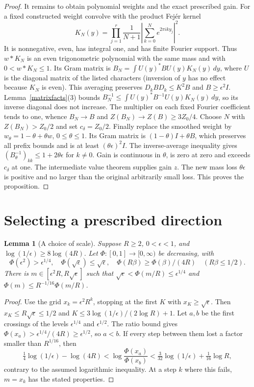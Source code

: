 \documentclass[reqno,a4paper,12pt]{amsart}
\newtheorem{lemma}[theorem]{Lemma}
\begin{document}
\begin{proof}
It remains to obtain polynomial weights and the exact prescribed gain.
For a fixed constructed weight convolve with the product Fej\'er kernel
\[
 K_N(y)=\prod_{j=1}^r\frac1{N+1}
 \left|\sum_{k=0}^N e^{2\pi iky_j}\right|^2.
\]
It is nonnegative, even, has integral one, and has finite Fourier support.
Thus $w*K_N$ is an even trigonometric polynomial with the same mass
and with $0<w*K_N\le1$. Its Gram matrix is
$B_N=\int U(y)^*BU(y)K_N(y)\,dy$, where $U$ is the diagonal matrix of
the listed characters (inversion of $y$ has no effect because $K_N$ is even).
This averaging preserves $D_kBD_k\le K^2B$ and $B\ge\epsilon^2I$.
Lemma~\ref{matrixfacts}(3) bounds
$B_N^{-1}\le\int U(y)^*B^{-1}U(y)K_N(y)\,dy$,
so its inverse diagonal does not increase.
The multiplier on each fixed Fourier coefficient tends to one, whence
$B_N\to B$ and $Z(B_N)\to Z(B)\ge3Z_0/4$.
Choose $N$ with $Z(B_N)>Z_0/2$ and set $c_\delta=Z_0/2$.
Finally replace the smoothed weight by $w_\theta=1-\theta+\theta w$,
$0\le\theta\le1$. Its Gram matrix is $(1-\theta)I+\theta B$,
which preserves all prefix bounds and is at least $(\theta\epsilon)^2I$.
The inverse-average inequality gives
$(B_\theta^{-1})_{kk}\le1+2\theta\epsilon$ for $k\ne0$.
Gain is continuous in $\theta$, is zero at zero and exceeds $c_\delta$
at one. The intermediate value theorem supplies gain $z$.
The new mass loss $\theta\epsilon$ is positive and no larger than the
original arbitrarily small loss. This proves the proposition.
\end{proof}

\section{Selecting a prescribed direction}

\begin{lemma}[A choice of scale]\label{scale}
Suppose $R\ge2$, $0<\epsilon<1$, and
$\log(1/\epsilon)\ge8\log(4R)$.
Let $\Phi:[0,1]\to[0,\infty)$ be decreasing, with
\[
 \Phi(\epsilon^2)>\epsilon^{1/4},\quad
 \Phi(\sqrt\epsilon)\le\sqrt\epsilon,\quad
 \Phi(R\beta)\ge\Phi(\beta)/(4R)\quad(R\beta\le1/2).
\]
There is $m\in[\epsilon^2R,R\sqrt\epsilon]$ such that
$\sqrt\epsilon<\Phi(m/R)\le\epsilon^{1/4}$ and
$\Phi(m)\le R^{-1/16}\Phi(m/R)$.
\end{lemma}
\begin{proof}
Use the grid $x_k=\epsilon^2R^k$, stopping at the first $K$ with
$x_K\ge\sqrt\epsilon$. Then $x_K\le R\sqrt\epsilon\le1/2$ and
$K\le3\log(1/\epsilon)/(2\log R)+1$.
Let $a,b$ be the first crossings of the levels $\epsilon^{1/4}$ and
$\epsilon^{1/2}$. The ratio bound gives
$\Phi(x_a)>\epsilon^{1/4}/(4R)\ge\epsilon^{1/2}$, so $a<b$.
If every step between them lost a factor smaller than $R^{1/16}$, then
\[
 \tfrac14\log(1/\epsilon)-\log(4R)
 <\log\frac{\Phi(x_a)}{\Phi(x_b)}
 <\tfrac3{32}\log(1/\epsilon)+\tfrac1{16}\log R,
\]
contrary to the assumed logarithmic inequality.
At a step $k$ where this fails, $m=x_k$ has the stated properties.
\end{proof}
\end{document}
